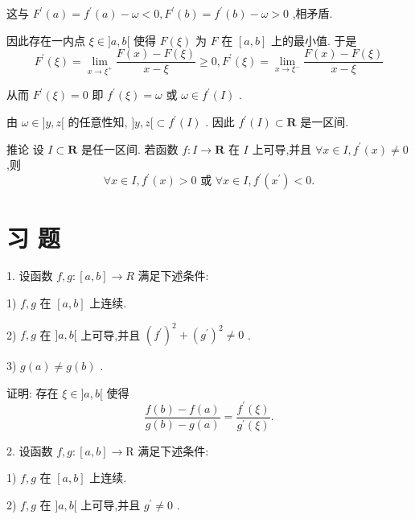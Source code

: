 这与 ${F}^{\prime }\left( a\right)  = {f}^{\prime }\left( a\right)  - \omega  < 0,{F}^{\prime }\left( b\right)  = {f}^{\prime }\left( b\right)  - \omega  > 0$ ,相矛盾.

因此存在一内点 $\xi  \in  \rbrack a,b\lbrack$ 使得 $F\left( \xi \right)$ 为 $F$ 在 $\left\lbrack  {a,b}\right\rbrack$ 上的最小值. 于是
$${F}^{\prime }\left( \xi \right)  = \mathop{\lim }\limits_{{x \rightarrow  {\xi }^{ + }}}\frac{F\left( x\right)  - F\left( \xi \right) }{x - \xi } \geq  0,{F}^{\prime }\left( \xi \right)  = \mathop{\lim }\limits_{{x \rightarrow  {\xi }^{ - }}}\frac{F\left( x\right)  - F\left( \xi \right) }{x - \xi }$$

从而 ${F}^{\prime }\left( \xi \right)  = 0$ 即 ${f}^{\prime }\left( \xi \right)  = \omega$ 或 $\omega  \in  {f}^{\prime }\left( I\right)$ .

由 $\omega  \in  \rbrack y,z\lbrack$ 的任意性知, $\rbrack y,z\lbrack  \subset  {f}^{\prime }\left( I\right)$ . 因此 ${f}^{\prime }\left( I\right)  \subset  \mathbf{R}$ 是一区间.

推论 设 $I \subset  \mathbf{R}$ 是任一区间. 若函数 $f : I \rightarrow  \mathbf{R}$ 在 $I$ 上可导,并且 $\forall x \in  I,{f}^{\prime }\left( x\right)  \neq  0$ ,则
$$\forall x \in  I,{f}^{\prime }\left( x\right)  > 0\text{ 或 }\forall x \in  I,{f}^{\prime }\left( {x}^{\prime }\right)  < 0.$$

\section*{习 题}

1. 设函数 $f,g : \left\lbrack  {a,b}\right\rbrack   \rightarrow  R$ 满足下述条件:

1) $f,g$ 在 $\left\lbrack  {a,b}\right\rbrack$ 上连续.

2) $f,g$ 在 $\rbrack a,b\lbrack$ 上可导,并且 ${\left( {f}^{\prime }\right) }^{2} + {\left( {g}^{\prime }\right) }^{2} \neq  0$ .

3) $g\left( a\right)  \neq  g\left( b\right)$ .

证明: 存在 $\xi  \in  \rbrack a,b\lbrack$ 使得
$$\frac{f\left( b\right)  - f\left( a\right) }{g\left( b\right)  - g\left( a\right) } = \frac{{f}^{\prime }\left( \xi \right) }{{g}^{\prime }\left( \xi \right) }.$$

2. 设函数 $f,g : \left\lbrack  {a,b}\right\rbrack   \rightarrow  \mathrm{R}$ 满足下述条件:

1) $f,g$ 在 $\left\lbrack  {a,b}\right\rbrack$ 上连续.

2) $f,g$ 在 $\rbrack a,b\lbrack$ 上可导,并且 ${g}^{\prime } \neq  0$ .

